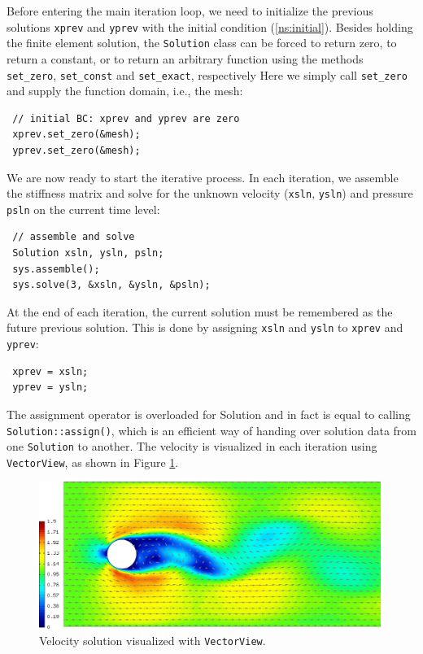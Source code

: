 \documentclass[11pt]{article}
\begin{document}
Before entering the main iteration loop, we need to initialize the previous solutions
{\tt xprev} and {\tt yprev} with the initial condition 
(\ref{ns:initial}). Besides holding the finite element solution, the {\tt Solution} class
can be forced to return zero, to return a constant, or to return an arbitrary function
using the methods \verb"set_zero", \verb"set_const" and \verb"set_exact", respectively
Here we simply call \verb"set_zero" and supply the
function domain, i.e., the mesh:
\begin{lstlisting}
 // initial BC: xprev and yprev are zero
 xprev.set_zero(&mesh);
 yprev.set_zero(&mesh);
\end{lstlisting}

We are now ready to start the iterative process. In each iteration, we assemble the
stiffness matrix and solve for the unknown velocity ({\tt xsln}, {\tt ysln}) and
pressure {\tt psln} on the current time level:
\begin{lstlisting}
 // assemble and solve
 Solution xsln, ysln, psln;
 sys.assemble();
 sys.solve(3, &xsln, &ysln, &psln);
\end{lstlisting}

At the end of each iteration, the current solution must be remembered as the future
previous solution. This is done by assigning {\tt xsln} and {\tt ysln} to {\tt xprev}
and {\tt yprev}:
\begin{lstlisting}
 xprev = xsln;
 yprev = ysln;
\end{lstlisting}
The assignment operator is overloaded for Solution and in fact is equal to calling
{\tt Solution::assign()}, which is an efficient way of handing over solution data from
one {\tt Solution} to another.
The velocity is visualized in each iteration using {\tt VectorView}, as shown
in Figure \ref{fig:velocity}.

\begin{figure}[!ht]
  \medskip \centering
  \includegraphics[width=0.99\textwidth]{img/velocity.jpg}
  \caption{Velocity solution visualized with {\tt VectorView}.}
  \label{fig:velocity}
\end{figure}
\end{document}
